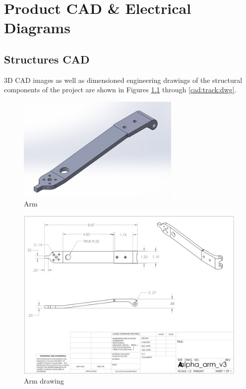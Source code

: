 \chapter{Product CAD \& Electrical Diagrams}

\section{Structures CAD}
3D CAD images as well as dimensioned engineering drawings of the structural components of the project are shown in Figures \ref{cad:arm} through \ref{cad:track:dwg}.

\begin{figure}[H]
    \centering
    \includegraphics[width=0.7\textwidth]{src/figs/arm-cad.png}
    \caption{Arm}
    \label{cad:arm}
\end{figure}

\begin{figure}[H]
    \centering
    \includegraphics[width=\textwidth]{src/figs/cad-and-dwgs/arm_dwg.png}
    \caption{Arm drawing}
    \label{cad:arm:dwg}
\end{figure}

